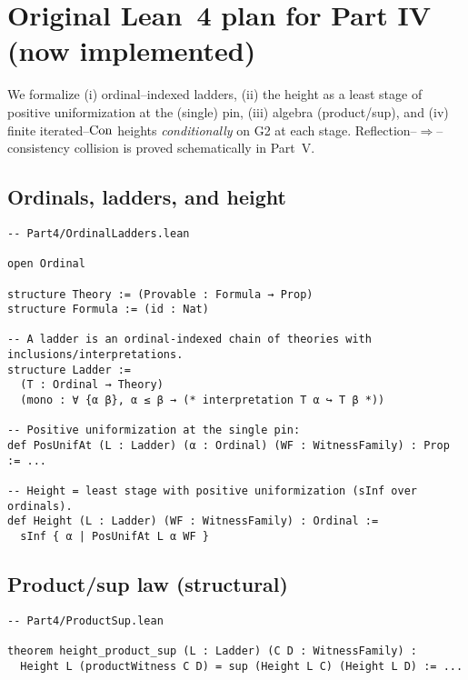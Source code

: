 \documentclass[11pt]{article}
\theoremstyle{definition}
\theoremstyle{remark}
\begin{document}
\section{Original Lean~4 plan for Part IV (now implemented)}

We formalize (i) ordinal–indexed ladders, (ii) the height as a least stage of positive uniformization at the (single) pin, (iii) algebra (product/sup), and (iv) finite iterated--$\mathrm{Con}$ heights \emph{conditionally} on G2 at each stage. Reflection–$\Rightarrow$–consistency collision is proved schematically in Part~V.

\subsection*{Ordinals, ladders, and height}
\begin{verbatim}
-- Part4/OrdinalLadders.lean

open Ordinal

structure Theory := (Provable : Formula → Prop)
structure Formula := (id : Nat)

-- A ladder is an ordinal-indexed chain of theories with inclusions/interpretations.
structure Ladder :=
  (T : Ordinal → Theory)
  (mono : ∀ {α β}, α ≤ β → (* interpretation T α ↪ T β *))

-- Positive uniformization at the single pin:
def PosUnifAt (L : Ladder) (α : Ordinal) (WF : WitnessFamily) : Prop := ...

-- Height = least stage with positive uniformization (sInf over ordinals).
def Height (L : Ladder) (WF : WitnessFamily) : Ordinal :=
  sInf { α | PosUnifAt L α WF }
\end{verbatim}

\subsection*{Product/sup law (structural)}
\begin{verbatim}
-- Part4/ProductSup.lean

theorem height_product_sup (L : Ladder) (C D : WitnessFamily) :
  Height L (productWitness C D) = sup (Height L C) (Height L D) := ...
\end{verbatim}
\end{document}
